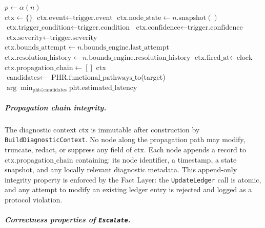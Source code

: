 \begin{algorithm}[htbp]
\begin{algorithmic}[1]
  \State $p \leftarrow \alpha(n)$
  \State {}
\EndProcedure
\\[6pt]
  \State $\text{ctx} \leftarrow \{\}$
  \State $\text{ctx.event} \leftarrow \text{trigger.event}$
  \State $\text{ctx.node\_state} \leftarrow n.\text{snapshot}()$
  \State $\text{ctx.trigger\_condition} \leftarrow \text{trigger.condition}$
  \State $\text{ctx.confidence} \leftarrow \text{trigger.confidence}$
  \State $\text{ctx.severity} \leftarrow \text{trigger.severity}$
  \State $\text{ctx.bounds\_attempt} \leftarrow n.\text{bounds\_engine.last\_attempt}$
  \State $\text{ctx.resolution\_history} \leftarrow n.\text{bounds\_engine.resolution\_history}$
  \State $\text{ctx.fired\_at} \leftarrow \text{clock}$
  \State $\text{ctx.propagation\_chain} \leftarrow []$
  \State \Return ctx
\EndProcedure
\\[6pt]
  \State $\text{candidates} \leftarrow$ PHR.$\text{functional\_pathways\_to}$(target)
  \State \Return $\displaystyle\arg\min_{\text{pht}\in\text{candidates}} \text{pht.estimated\_latency}$
\EndProcedure
\end{algorithmic}
\end{algorithm}

\subparagraph{Propagation chain integrity.} The diagnostic context $\text{ctx}$ is immutable after construction by \texttt{BuildDiagnosticContext}. No node along the propagation path may modify, truncate, redact, or suppress any field of $\text{ctx}$. Each node appends a record to $\text{ctx.propagation\_chain}$ containing: its node identifier, a timestamp, a state snapshot, and any locally relevant diagnostic metadata. This append-only integrity property is enforced by the Fact Layer: the \texttt{UpdateLedger} call is atomic, and any attempt to modify an existing ledger entry is rejected and logged as a protocol violation.

\subparagraph{Correctness properties of \texttt{Escalate}.}

